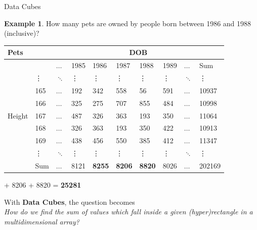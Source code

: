\documentclass{beamer}
\theoremstyle{definition}
\newtheorem{myexample}{Example}
\theoremstyle{definition}
\begin{document}
\begin{frame}{Data Cubes}
    \begin{myexample}
        How many pets are owned by people born between 1986 and 1988 (inclusive)?
    \end{myexample}

    \begin{table}[h]\footnotesize
        \begin{tabular} { | l | l | l | l | l | l | l | l | l | l |}
        \hline
        \textbf{Pets} & & \multicolumn{8}{|c|}{DOB} \\ \hline
        & & $\hdots$ & 1985 & 1986 & 1987 & 1988 & 1989 & $\hdots$ & Sum \\ \hline
        \multirow{7}{*}{Height}
        & \vdots & $\ddots$ & \vdots & \vdots & \vdots & \vdots & \vdots & $\ddots$ & \vdots \\
        & 165 & $\hdots$ & 192 & 342 & 558 & 56 & 591 & $\hdots$ & 10937 \\
        & 166 & $\hdots$ & 325 & 275 & 707 & 855 & 484 & $\hdots$ & 10998 \\
        & 167 & $\hdots$ & 487 & 326 & 363 & 193 & 350 & $\hdots$ & 11064 \\
        & 168 & $\hdots$ & 326 & 363 & 193 & 350 & 422 & $\hdots$ & 10913 \\
        & 169 & $\hdots$ & 438 & 456 & 550 & 385 & 412 & $\hdots$ & 11347 \\
        & \vdots & $\ddots$ & \vdots & \vdots & \vdots & \vdots & \vdots & $\ddots$ & \vdots \\
        & Sum & $\hdots$ & 8121 & \textbf{8255} & \textbf{8206} & \textbf{8820} & 8026 & $\hdots$ & 202169 \\
        \hline
        \end{tabular}
    \end{table}
     + 8206 + 8820 = \textbf{25281}
\end{frame}

\begin{frame}
    With \textbf{Data Cubes}, the question becomes \\
    \textit{How do we find the sum of values which fall inside a given (hyper)rectangle in a multidimensional array?}
\end{frame}
\end{document}
